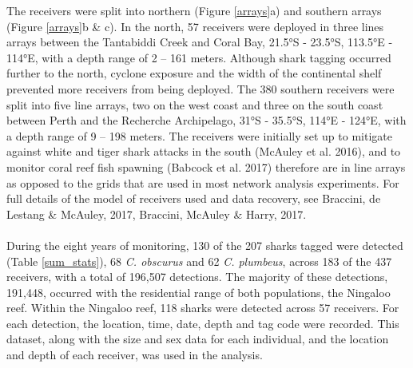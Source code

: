 \documentclass[11pt,a4paper]{article}
\begin{document}
	
	The receivers were split into northern (Figure \ref{arrays}a) and southern arrays (Figure \ref{arrays}b \& c). In the north, 57 receivers were deployed in three lines arrays between the Tantabiddi Creek and Coral Bay, 21.5°S - 23.5°S, 113.5°E - 114°E, with a depth range of 2 – 161 meters. Although shark tagging occurred further to the north, cyclone exposure and the width of the continental shelf prevented more receivers from being deployed. The 380 southern receivers were split into five line arrays, two on the west coast and three on the south coast between Perth and the Recherche Archipelago, 31°S - 35.5°S, 114°E - 124°E, with a depth range of 9 – 198 meters. The receivers were initially set up to mitigate against white and tiger shark attacks in the south (McAuley et al. 2016), and to monitor coral reef fish spawning (Babcock et al. 2017) therefore are in line arrays as opposed to the grids that are used in most network analysis experiments. For full details of the model of receivers used and data recovery, see Braccini, de Lestang \& McAuley, 2017, Braccini, McAuley \& Harry, 2017.\\
	\\
	During the eight years of monitoring, 130 of the 207 sharks tagged were detected (Table \ref{sum_stats}), 68 \textit{C. obscurus} and 62 \textit{C. plumbeus}, across 183 of the 437 receivers, with a total of 196,507 detections. The majority of these detections, 191,448, occurred with the residential range of both populations, the Ningaloo reef. Within the Ningaloo reef, 118 sharks were detected across 57 receivers. For each detection, the location, time, date, depth and tag code were recorded. This dataset, along with the size and sex data for each individual, and the location and depth of each receiver, was used in the analysis. \\
	
\end{document}
